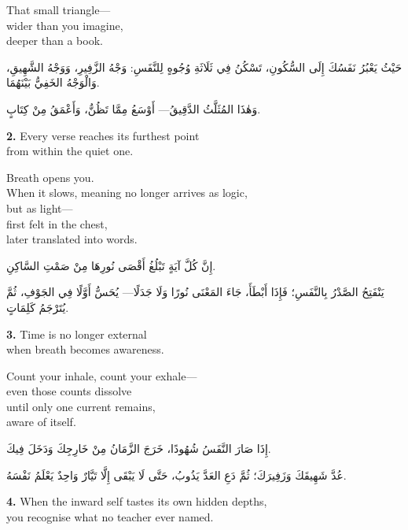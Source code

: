 \documentclass[11pt,a4paper,twoside]{book}
\begin{document}
That small triangle—\\
wider than you imagine,\\
deeper than a book.

\begin{flushright}
{\arabicfont
حَيْثُ يَعْبُرُ نَفَسُكَ إِلَى السُّكُونِ،
تَسْكُنُ فِي ثَلَاثَةِ وُجُوهٍ لِلنَّفَسِ:
وَجْهُ الزَّفِيرِ، وَوَجْهُ الشَّهِيقِ، وَالْوَجْهُ الخَفِيُّ بَيْنَهُمَا.

وَهٰذَا المُثَلَّثُ الدَّقِيقُ—
أَوْسَعُ مِمَّا تَظُنُّ، وَأَعْمَقُ مِنْ كِتَابٍ.}
\end{flushright}

\vspace{1em}
{\color{indigo}\bfseries 2.}\quad
Every verse reaches its furthest point\\
from within the quiet one.

Breath opens you.\\
When it slows, meaning no longer arrives as logic,\\
but as light—\\
first felt in the chest,\\
later translated into words.

\begin{flushright}
{\arabicfont
إِنَّ كُلَّ آيَةٍ تَبْلُغُ أَقْصَى نُورِهَا مِنْ صَمْتِ السَّاكِنِ.

يَنْفَتِحُ الصَّدْرُ بِالنَّفَسِ؛
فَإِذَا أَبْطَأَ، جَاءَ المَعْنَى نُورًا وَلَا جَدَلًا—
يُحَسُّ أَوَّلًا فِي الجَوْفِ، ثُمَّ يُتَرْجَمُ كَلِمَاتٍ.}
\end{flushright}

\vspace{1em}
{\color{indigo}\bfseries 3.}\quad
Time is no longer external\\
when breath becomes awareness.

Count your inhale, count your exhale—\\
even those counts dissolve\\
until only one current remains,\\
aware of itself.

\begin{flushright}
{\arabicfont
إِذَا صَارَ النَّفَسُ شُهُودًا،
خَرَجَ الزَّمَانُ مِنْ خَارِجِكَ وَدَخَلَ فِيكَ.

عُدَّ شَهِيقَكَ وَزَفِيرَكَ؛
ثُمَّ دَعِ العَدَّ يَذُوبُ،
حَتَّى لَا يَبْقَى إِلَّا تَيَّارٌ وَاحِدٌ يَعْلَمُ نَفْسَهُ.}
\end{flushright}

\vspace{1em}
{\color{indigo}\bfseries 4.}\quad
When the inward self tastes its own hidden depths,\\
you recognise what no teacher ever named.
\end{document}

